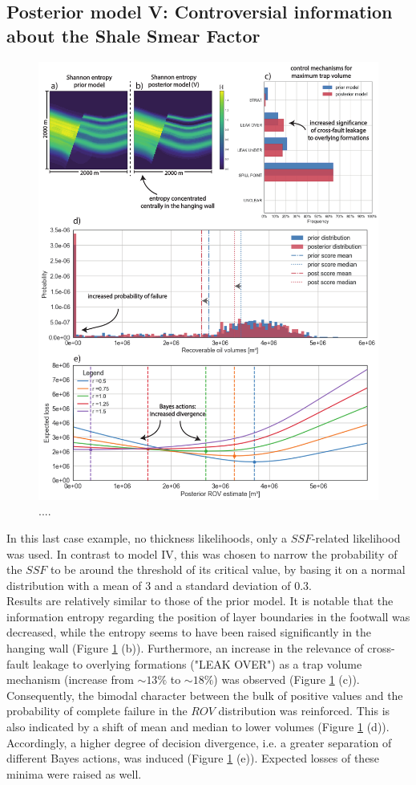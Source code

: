		\subsection{Posterior model V: Controversial information about the Shale Smear Factor}%
		\begin{figure}[p!]
			\centering
			\includegraphics[width=1\textwidth]{Figures/ML5}
			\caption{....}\label{fig:ML5}
		\end{figure}
		In this last case example, no thickness likelihoods, only a $SSF$-related likelihood was used. In contrast to model IV, this was chosen to narrow the probability of the $SSF$ to be around the threshold of its critical value, by basing it on a normal distribution with a mean of 3 and a standard deviation of 0.3.\\
		Results are relatively similar to those of the prior model. It is notable that the information entropy regarding the position of layer boundaries in the footwall was decreased, while the entropy seems to have been raised significantly in the hanging wall (Figure \ref{fig:ML5} (b)). Furthermore, an increase in the relevance of cross-fault leakage to overlying formations ("LEAK OVER") as a trap volume mechanism (increase from $\sim13\%$ to $\sim18\%$) was observed (Figure \ref{fig:ML5} (c)). Consequently, the bimodal character between the bulk of positive values and the probability of complete failure in the $ROV$ distribution was reinforced. This is also indicated by a shift of mean and median to lower volumes (Figure \ref{fig:ML5} (d)). Accordingly, a higher degree of decision divergence, i.e. a greater separation of different Bayes actions, was induced (Figure \ref{fig:ML5} (e)). Expected losses of these minima were raised as well.\\
